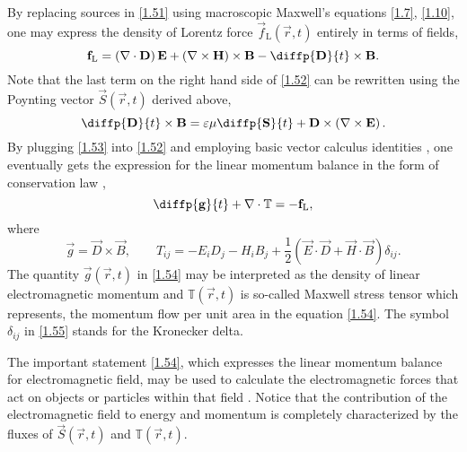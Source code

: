 By replacing sources in \ref{1.51} using macroscopic Maxwell's equations \ref{1.7}, \ref{1.10}, one may express the density of Lorentz force $ \vec{f}_\mathrm{L} \left( \vec{r}, t \right) $ entirely in terms of fields,
\begin{equation}
\label{1.52}
\vec{f}_\mathrm{L} = \left(\div{\vec{D}} \right) \vec{E} + \left(\rot{\vec{H}} \right) \times \vec{B} - \diffp{\vec{D}}{t} \times \vec{B}.
\end{equation}
Note that the last term on the right hand side of \ref{1.52} can be rewritten using the Poynting vector $ \vec{S}\left( \vec{r}, t \right) $ derived above, 
\begin{equation}
\label{1.53}
\diffp{\vec{D}}{t} \times \vec{B} = \varepsilon \mu \diffp{\vec{S}}{t} + \vec{D} \times \left(\rot{\vec{E}} \right).
\end{equation}
By plugging \ref{1.53} into \ref{1.52} and employing basic vector calculus identities \cite{huba}, one eventually gets the expression for the linear momentum balance in the form of conservation law \cite{Jackson2005},
\begin{equation}
\label{1.54}
\diffp{\vec{g}}{t} + \div{\mathbb{T}} = -\vec{f}_\mathrm{L},
\end{equation}
where
\begin{equation}
\label{1.55}
\vec{g} = \vec{D} \times \vec{B}, \qquad T_{ij} = - E_i D_j - H_i B_j + \frac{1}{2} \left(\vec{E} \cdot \vec{D} + \vec{H} \cdot \vec{B} \right) \delta_{ij}.
\end{equation}
The quantity $ \vec{g}\left( \vec{r}, t \right) $ in \ref{1.54} may be interpreted as the density of linear electromagnetic momentum and $ \mathbb{T}\left( \vec{r}, t \right) $ is so-called Maxwell stress tensor which represents, the momentum flow per unit area in the equation \ref{1.54}. The symbol $ \delta_{ij} $ in \ref{1.55} stands for the Kronecker delta.

The important statement \ref{1.54}, which expresses the linear momentum balance for electromagnetic field, may be used to calculate the electromagnetic forces that act on objects or particles within that field \cite{Jackson2005}. Notice that the contribution of the electromagnetic field to energy and momentum is completely characterized by the fluxes of $ \vec{S}\left( \vec{r}, t \right) $ and $ \mathbb{T}\left( \vec{r}, t \right) $.



